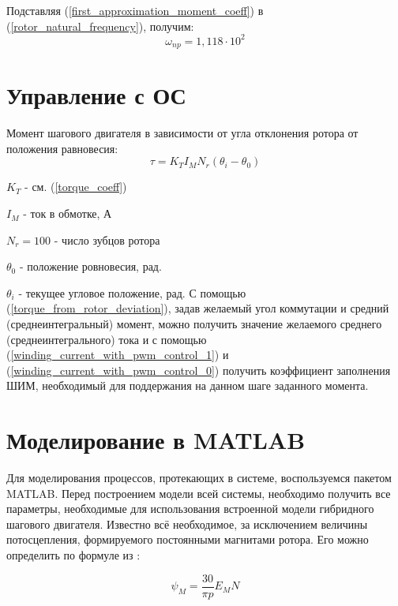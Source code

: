 Подставляя (\ref{first_approximation_moment_coeff}) в (\ref{rotor_natural_frequency}), получим:
\begin{equation}
    \label{first_approximation_rotor_natural_frequency}
    \omega_{np} = 1,118\cdot10^{2}
\end{equation}

\newpage
\part{ Управление с ОС }

Момент шагового двигателя в зависимости от угла отклонения ротора от положения равновесия:
\begin{equation}
    \label{torque_from_rotor_deviation}
    \tau = K_{T} I_{M} N_{r} (\theta_{i} - \theta_{0})
\end{equation}

$K_{T}$ - см. (\ref{torque_coeff})

$I_{M}$ - ток в обмотке, А

$N_{r} = 100$ - число зубцов ротора

$\theta_{0}$ - положение ровновесия, рад.

$\theta_{i}$ - текущее угловое положение, рад.
\newline\newline
С помощью (\ref{torque_from_rotor_deviation}), задав желаемый угол коммутации и средний (среднеинтегральный) момент, можно получить значение желаемого среднего (среднеинтегрального) тока и с помощью (\ref{winding_current_with_pwm_control_1}) и (\ref{winding_current_with_pwm_control_0}) получить коэффициент заполнения ШИМ, необходимый для поддержания на данном шаге заданного момента.

\newpage
\part{ Моделирование в MATLAB }
Для моделирования процессов, протекающих в системе, воспользуемся пакетом MATLAB. Перед построением модели всей системы, необходимо получить все параметры, необходимые для использования встроенной модели гибридного шагового двигателя. Известно всё необходимое, за исключением величины потосцепления, формируемого постоянными магнитами ротора. Его можно определить по формуле из \cite{Matlab_help_stepper_motor}:

\begin{equation}
    \label{maximum_flux_linkage}
    \psi_{M} = \frac{30}{\pi p} E_{M} N
\end{equation}

